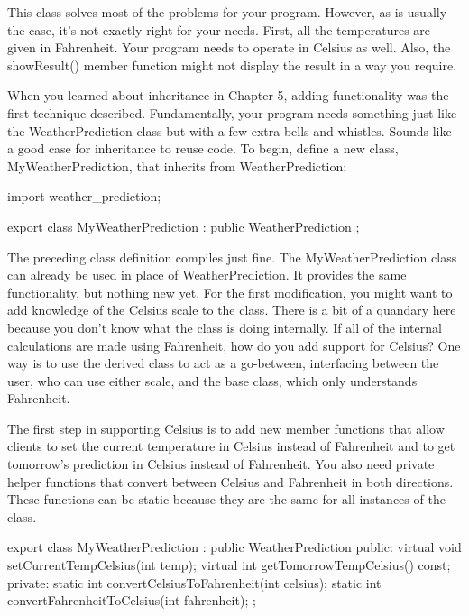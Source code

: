 This class solves most of the problems for your program. However, as is usually the case, it’s not exactly right for your needs. First, all the temperatures are given in Fahrenheit. Your program needs to operate in Celsius as well. Also, the showResult() member function might not display the result in a way you require.


When you learned about inheritance in Chapter 5, adding functionality was the first technique described. Fundamentally, your program needs something just like the WeatherPrediction class but with a few extra bells and whistles. Sounds like a good case for inheritance to reuse code. To begin, define a new class, MyWeatherPrediction, that inherits from WeatherPrediction:

\begin{cpp}
import weather_prediction;

export class MyWeatherPrediction : public WeatherPrediction
{
};
\end{cpp}

The preceding class definition compiles just fine. The MyWeatherPrediction class can already be used in place of WeatherPrediction. It provides the same functionality, but nothing new yet. For the first modification, you might want to add knowledge of the Celsius scale to the class. There is a bit of a quandary here because you don’t know what the class is doing internally. If all of the internal calculations are made using Fahrenheit, how do you add support for Celsius? One way is to use the derived class to act as a go-between, interfacing between the user, who can use either scale, and the base class, which only understands Fahrenheit.

The first step in supporting Celsius is to add new member functions that allow clients to set the current temperature in Celsius instead of Fahrenheit and to get tomorrow’s prediction in Celsius instead of Fahrenheit. You also need private helper functions that convert between Celsius and Fahrenheit in both directions. These functions can be static because they are the same for all instances of the class.

\begin{cpp}
export class MyWeatherPrediction : public WeatherPrediction
{
    public:
        virtual void setCurrentTempCelsius(int temp);
        virtual int getTomorrowTempCelsius() const;
    private:
        static int convertCelsiusToFahrenheit(int celsius);
        static int convertFahrenheitToCelsius(int fahrenheit);
};
\end{cpp}

